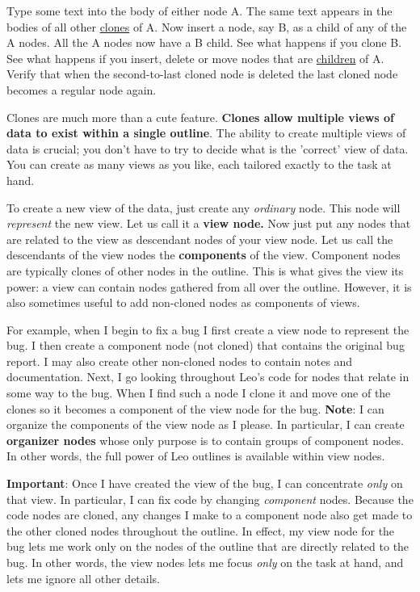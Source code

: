 \documentclass[10pt,a4paper,english]{article}
\begin{document}
Type some text into the body of either node A. The same text appears in the
bodies of all other \href{glossary.html\#clones}{clones} of A. Now insert a node, say B, as a child of any of
the A nodes. All the A nodes now have a B child. See what happens if you clone
B. See what happens if you insert, delete or move nodes that are \href{glossary.html\#child}{children} of A.
Verify that when the second-to-last cloned node is deleted the last cloned node
becomes a regular node again.

Clones are much more than a cute feature. \textbf{Clones allow multiple views of data
to exist within a single outline}. The ability to create multiple views of data
is crucial; you don't have to try to decide what is the 'correct' view of data.
You can create as many views as you like, each tailored exactly to the task at hand.

To create a new view of the data, just create any \emph{ordinary} node. This node
will \emph{represent} the new view. Let us call it a \textbf{view node.} Now just put any
nodes that are related to the view as descendant nodes of your view node. Let us
call the descendants of the view nodes the \textbf{components} of the view. Component
nodes are typically clones of other nodes in the outline. This is what gives the
view its power: a view can contain nodes gathered from all over the outline.
However, it is also sometimes useful to add non-cloned nodes as components of
views.

For example, when I begin to fix a bug I first create a view node to represent
the bug. I then create a component node (not cloned) that contains the original
bug report. I may also create other non-cloned nodes to contain notes and
documentation. Next, I go looking throughout Leo's code for nodes that relate in
some way to the bug. When I find such a node I clone it and move one of the
clones so it becomes a component of the view node for the bug. \textbf{Note}: I can
organize the components of the view node as I please. In particular, I can
create \textbf{organizer nodes} whose only purpose is to contain groups of component
nodes. In other words, the full power of Leo outlines is available within view
nodes.

\textbf{Important}: Once I have created the view of the bug, I can concentrate \emph{only}
on that view. In particular, I can fix code by changing \emph{component} nodes.
Because the code nodes are cloned, any changes I make to a component node also
get made to the other cloned nodes throughout the outline. In effect, my view
node for the bug lets me work only on the nodes of the outline that are directly
related to the bug. In other words, the view nodes lets me focus \emph{only} on the
task at hand, and lets me ignore all other details.
\end{document}
